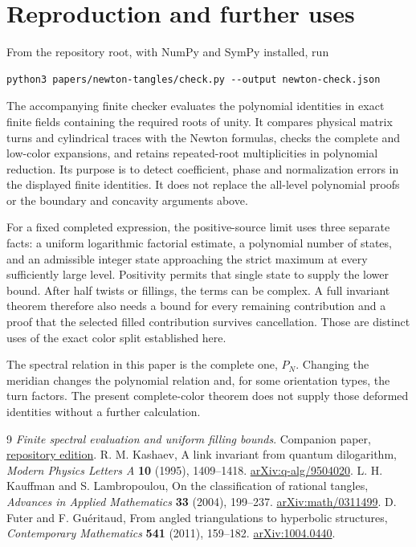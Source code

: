 \documentclass[11pt]{article}
\numberwithin{equation}{section}
\theoremstyle{definition}\newtheorem{definition}[theorem]{Definition}
\theoremstyle{remark}\newtheorem{remark}[theorem]{Remark}
\begin{document}
\section{Reproduction and further uses}\label{nt:reproduction}
From the repository root, with NumPy and SymPy installed, run
\begin{verbatim}
python3 papers/newton-tangles/check.py --output newton-check.json
\end{verbatim}
The accompanying finite checker evaluates the polynomial identities in
exact finite fields containing the required roots of unity. It compares
physical matrix turns and cylindrical traces with the Newton formulas,
checks the complete and low-color expansions, and retains repeated-root
multiplicities in polynomial reduction. Its purpose is to detect
coefficient, phase and normalization errors in the displayed finite
identities. It does not replace the all-level polynomial proofs or the
boundary and concavity arguments above.

For a fixed completed expression, the positive-source limit uses three
separate facts: a uniform logarithmic factorial estimate, a polynomial
number of states, and an admissible integer state approaching the strict
maximum at every sufficiently large level. Positivity permits that
single state to supply the lower bound. After half twists or fillings,
the terms can be complex. A full invariant theorem therefore also needs
a bound for every remaining contribution and a proof that the selected
filled contribution survives cancellation. Those are distinct uses of
the exact color split established here.

The spectral relation in this paper is the complete one, $P_N$.
Changing the meridian changes the polynomial relation and, for some
orientation types, the turn factors. The present complete-color theorem
does not supply those deformed identities without a further calculation.

\begin{thebibliography}{9}
\emph{Finite spectral evaluation and uniform filling bounds}.
Companion paper, \href{https://sashakolpakov.github.io/murakamis_dream/papers/filling-bounds.pdf}{repository edition}.
 R. M. Kashaev,
A link invariant from quantum dilogarithm,
\emph{Modern Physics Letters A} \textbf{10} (1995), 1409--1418.
\href{https://arxiv.org/abs/q-alg/9504020}{arXiv:q-alg/9504020}.
 L. H. Kauffman and S. Lambropoulou,
On the classification of rational tangles,
\emph{Advances in Applied Mathematics} \textbf{33} (2004), 199--237.
\href{https://arxiv.org/abs/math/0311499}{arXiv:math/0311499}.
 D. Futer and F. Gu\'eritaud,
From angled triangulations to hyperbolic structures,
\emph{Contemporary Mathematics} \textbf{541} (2011), 159--182.
\href{https://arxiv.org/abs/1004.0440}{arXiv:1004.0440}.
\end{thebibliography}
\end{document}
